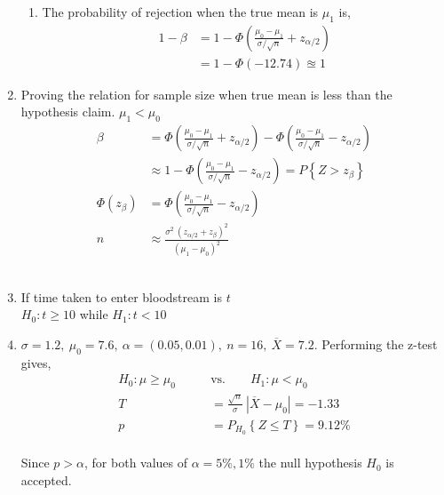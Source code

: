 \begin{enumerate}
\begin{enumerate}
			\item The probability of rejection when the true mean is $ \mu_1 $ is,\\
			
			\begin{align}
				1 - \beta &= 1 - \Phi\left(\frac{\mu_0 - \mu_1}{\sigma/\sqrt{n}} + z_{\alpha/2}\right) \nonumber \\
				&= 1 - \Phi(-12.74) \approxeq 1
			\end{align}
		\end{enumerate}
	
	\item Proving the relation for sample size when true mean is less than the hypothesis claim. $ \mu_1 < \mu_0 $\\
	
		\begin{align}
			\beta &= \Phi\left(\frac{\mu_0 - \mu_1}{\sigma/\sqrt{n}} + z_{\alpha/2}\right) - \Phi\left( \frac{\mu_0 - \mu_1}{\sigma/\sqrt{n}} - z_{\alpha/2} \right)  \\
			&\approx 1 - \Phi\left(\frac{\mu_0 - \mu_1}{\sigma/\sqrt{n}} - z_{\alpha/2}\right) = P\left\{Z > z_\beta\right\} \nonumber \\
			\Phi(z_\beta) &= \Phi\left(\frac{\mu_0 - \mu_1}{\sigma/\sqrt{n}} - z_{\alpha/2}\right) \nonumber \\
			n &\approx \frac{\sigma^2\ (z_{\alpha/2} + z_\beta)^2}{(\mu_1 - \mu_0)^2}
		\end{align}\\
	
	
	\item If time taken to enter bloodstream is $ t $ \\
	$ H_0 : t \geq 10 $ while $ H_1 : t < 10 $ \\
	
	\item $ \sigma = 1.2,\ \mu_0 = 7.6,\ \alpha = (0.05, 0.01),\ n = 16,\ \overline{X} = 7.2$. Performing the z-test gives,\\
	
		\begin{align}
			H_0 : \mu \geq \mu_0 \qquad &\text{vs.} \qquad H_1 : \mu < \mu_0 \nonumber \\
			T &= \frac{\sqrt{n}}{\sigma}\ |\overline{X} - \mu_0| = -1.33 \nonumber \\
			p &= P_{H_0}\left\{Z \leq T\right\} = 9.12\% 
		\end{align}\\
		Since $ p > \alpha $,  for both values of $ \alpha = 5\%, 1\% $ the null hypothesis $ H_0 $ is accepted.\\
	

\end{enumerate}
